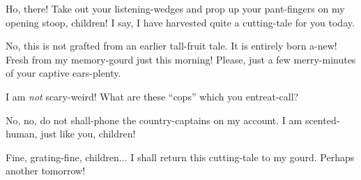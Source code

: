 Ho, there! Take out your listening-wedges and prop up your pant-fingers
on my opening stoop, children! I say, I have harvested quite a
cutting-tale for you today.

No, this is not grafted from an earlier tall-fruit tale. It is entirely
born a-new! Fresh from my memory-gourd just this morning! Please, just a
few merry-minutes of your captive ears-plenty.

I am \emph{not} scary-weird! What are these ``cops'' which you
entreat-call?

No, no, do not shall-phone the country-captains on my account. I am
scented-human, just like you, children!

Fine, grating-fine, children... I shall return this cutting-tale to my
gourd. Perhaps another tomorrow!
